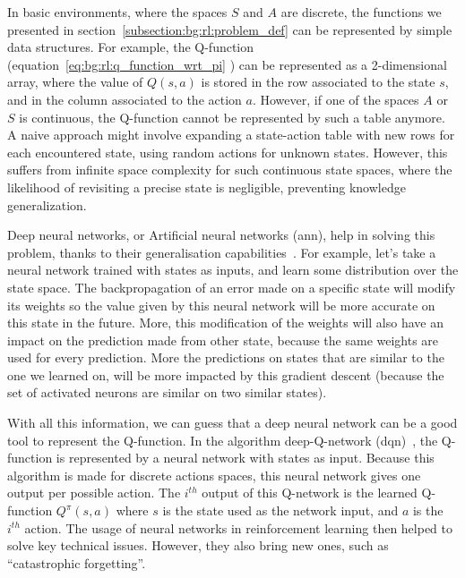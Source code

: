 In basic environments, where the spaces $S$ and $A$ are discrete, the functions we presented in
section~\ref{subsection:bg:rl:problem_def} can be represented by simple data structures.
For example, the Q-function (equation~\ref{eq:bg:rl:q_function_wrt_pi} %
) can be represented as a 2-dimensional array,
where the value of $Q(s, a)$ is stored in the row associated to the state $s$, and in the column associated to the
action $a$.
However, if one of the spaces $A$ or $S$ is continuous, the Q-function cannot be represented by such a table anymore.
A naive approach might involve expanding a state-action table with new rows for each encountered state, using random actions for unknown states. However, this suffers from infinite space complexity for such continuous state spaces, where the likelihood of revisiting a precise state is negligible, preventing knowledge generalization.

Deep neural networks, or Artificial neural networks (\acrshort{ann}), help in solving this problem, thanks to their 
generalisation capabilities~\citep{zhang2021understanding}.
For example, let's take a neural network trained with states as inputs, and learn some distribution over the state
space.
The backpropagation of an error made on a specific state will modify its weights so the value given by this neural 
network will be more accurate on this state in the future.
More, this modification of the weights will also have an impact on the prediction made from other state,
because the same weights are used for every prediction. 
More the predictions on states that are similar to the one we learned on, will be more impacted by this gradient 
descent (because the set of activated neurons are similar on two similar states).

With all this information, we can guess that a deep neural network can be a good tool to represent the Q-function.
In the algorithm deep-Q-network (\acrshort{dqn})~\citep{mnih2013playing}, the Q-function is represented by a neural network with
states as input.
Because this algorithm is made for discrete actions spaces, this neural network gives one output per possible
action.
The $i^{th}$ output of this Q-network is the learned Q-function $Q^\pi(s, a)$ where $s$ is the state used as the
network input, and $a$ is the $i^{th}$ action. %
The usage of neural networks in reinforcement learning then helped to solve key technical issues.
However, they also bring new ones, such as ``catastrophic forgetting''.

